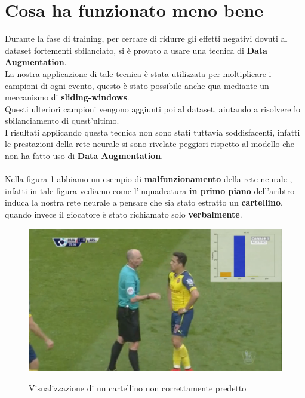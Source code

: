 \section{Cosa ha funzionato meno bene}
Durante la fase di training, per cercare di ridurre gli effetti negativi dovuti al dataset fortementi sbilanciato, si è provato a usare una tecnica di \textbf{Data Augmentation}.
\\La nostra applicazione di tale tecnica è stata utilizzata per moltiplicare i campioni di ogni evento, questo è stato possibile anche qua mediante un meccanismo di \textbf{sliding-windows}.
\\Questi ulteriori campioni vengono aggiunti poi al dataset, aiutando a risolvere lo sbilanciamento di quest'ultimo.
\\I risultati applicando questa tecnica non sono stati tuttavia soddisfacenti, infatti le prestazioni della rete neurale si sono rivelate peggiori rispetto al modello che non ha fatto uso di \textbf{Data Augmentation}.\\
\\Nella figura \ref{figure : fakecard} abbiamo un esempio di \textbf{malfunzionamento} della rete neurale , infatti in tale figura vediamo come l'inquadratura \textbf{in primo piano} dell'aribtro induca la nostra rete neurale a pensare che sia stato estratto un \textbf{cartellino}, quando invece il giocatore è stato richiamato solo \textbf{verbalmente}.
\begin{figure}[ht]
\centering
\caption{Visualizzazione di un cartellino non correttamente predetto}
\includegraphics[width=\linewidth]{img/fakecard.png}
\label{figure : fakecard}
\end{figure}

